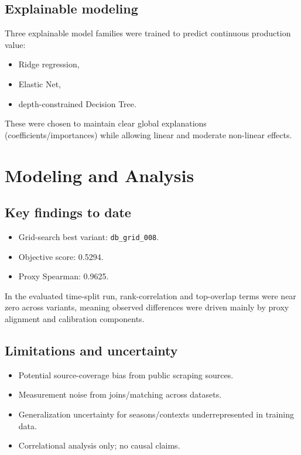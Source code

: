 \documentclass[10pt]{article}
\begin{document}
\subsection{Explainable modeling}
Three explainable model families were trained to predict continuous production value:
\begin{itemize}
  \item Ridge regression,
  \item Elastic Net,
  \item depth-constrained Decision Tree.
\end{itemize}

These were chosen to maintain clear global explanations (coefficients/importances) while allowing linear and moderate non-linear effects.

\section{Modeling and Analysis}
\subsection{Key findings to date}
\begin{itemize}
  \item Grid-search best variant: \texttt{db\_grid\_008}.
  \item Objective score: 0.5294.
  \item Proxy Spearman: 0.9625.
\end{itemize}

In the evaluated time-split run, rank-correlation and top-overlap terms were near zero across variants, meaning observed differences were driven mainly by proxy alignment and calibration components.

\subsection{Limitations and uncertainty}
\begin{itemize}
  \item Potential source-coverage bias from public scraping sources.
  \item Measurement noise from joins/matching across datasets.
  \item Generalization uncertainty for seasons/contexts underrepresented in training data.
  \item Correlational analysis only; no causal claims.
\end{itemize}
\end{document}
